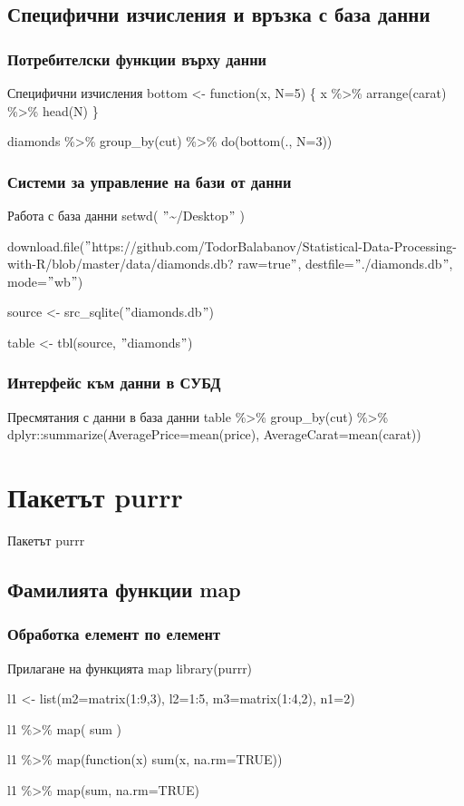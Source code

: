 \documentclass{beamer}
\begin{document}
\subsection{Специфични изчисления и връзка с база данни}

\begin{frame}
\frametitle{Потребителски функции върху данни}
\begin{block}{Специфични изчисления}
bottom <- function(x, N=5) \{ x \%>\% arrange(carat) \%>\% head(N) \}

diamonds \%>\% group\_by(cut) \%>\% do(bottom(., N=3))
\end{block}
\end{frame}

\begin{frame}
\frametitle{Системи за управление на бази от данни}
\begin{block}{Работа с база данни}
setwd( $"$\textasciitilde /Desktop$"$ )

download.file($"$https://github.com/TodorBalabanov/Statistical-Data-Processing-with-R/blob/master/data/diamonds.db? raw=true$"$, destfile=$"$./diamonds.db$"$, mode=$"$wb$"$)

source <- src\_sqlite($"$diamonds.db$"$)

table <- tbl(source, $"$diamonds$"$)
\end{block}
\end{frame}

\begin{frame}
\frametitle{Интерфейс към данни в СУБД}
\begin{block}{Пресмятания с данни в база данни}
table \%>\% group\_by(cut) \%>\% dplyr::summarize(AveragePrice=mean(price), AverageCarat=mean(carat))
\end{block}
\end{frame}

\section{Пакетът purrr}

\begin{frame}
\center \huge{Пакетът purrr}
\end{frame}

\subsection{Фамилията функции map}

\begin{frame}
\frametitle{Обработка елемент по елемент}
\begin{block}{Прилагане на функцията map}
library(purrr)

l1 <- list(m2=matrix(1:9,3), l2=1:5, m3=matrix(1:4,2), n1=2)

l1 \%>\% map( sum )

l1 \%>\% map(function(x) sum(x, na.rm=TRUE))

l1 \%>\% map(sum, na.rm=TRUE)
\end{block}
\end{frame}
\end{document}
